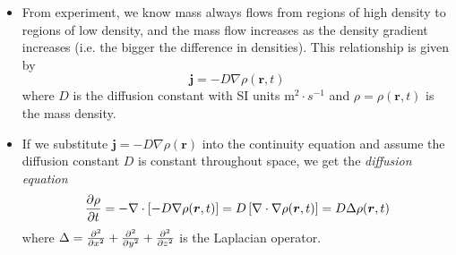 \documentclass[11pt, a4paper]{article}
\begin{document}
\begin{itemize}
	\item From experiment, we know mass always flows from regions of high density to regions of low density, and the mass flow increases as the density gradient increases (i.e. the bigger the difference in densities). This relationship is given by
	\begin{equation*}
		\bm{j} = - D \nabla \rho(\bm{r}, t)
	\end{equation*}
	where $ D $ is the diffusion constant with SI units $ \si{\meter^{2} \cdot s^{-1}} $ and $ \rho = \rho(\bm{r}, t) $ is the mass density.
	
	\item If we substitute $ \bm{j} = - D \nabla \rho(\bm{r}) $ into the continuity equation and assume  the diffusion constant $ D $ is constant throughout space, we get the \textit{diffusion equation}
	\begin{equation*}
		\pdv{\rho}{t} = - \nabla \cdot \left[- D \nabla \rho(\bm{r}, t)\right] = D \left[\nabla \cdot \nabla \rho(\bm{r}, t)\right] = D \Delta \rho(\bm{r}, t)
	\end{equation*}
	where $ \Delta = \pdv[2]{}{x} + \pdv[2]{}{y} + \pdv[2]{}{z}$ is the Laplacian operator.
	
\end{itemize}
\end{document}
